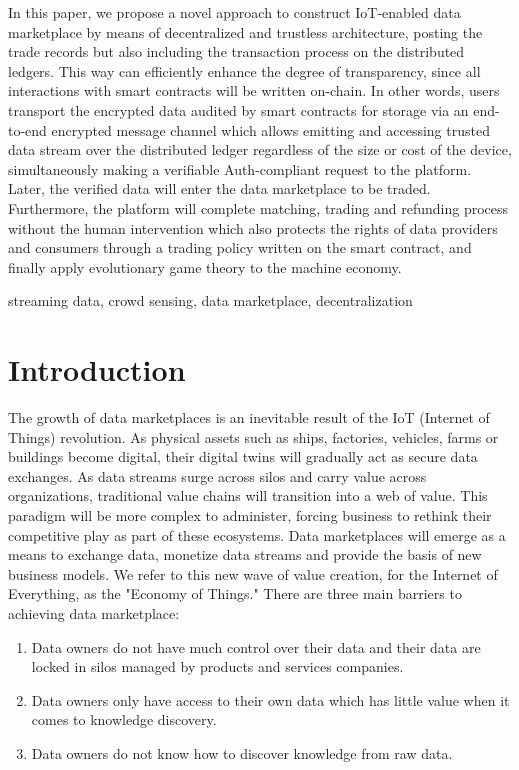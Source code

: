 \documentclass[journal,10pt,a4paper]{IEEEtran}
\begin{document}
In this paper, we propose a novel approach to construct IoT-enabled data marketplace by means of decentralized and trustless architecture, posting the trade records but also including the transaction process on the distributed ledgers. This way can efficiently enhance the degree of transparency, since all interactions with smart contracts will be written on-chain. In other words, users transport the encrypted data audited by smart contracts for storage via an end-to-end encrypted message channel which allows emitting and accessing trusted data stream over the distributed ledger regardless of the size or cost of the device, simultaneously making a verifiable Auth-compliant request to the platform. Later, the verified data will enter the data marketplace to be traded. Furthermore, the platform will complete matching, trading and refunding process without the human intervention which also protects the rights of data providers and consumers through a trading policy written on the smart contract, and finally apply evolutionary game theory to the machine economy.

\begin{IEEEkeywords}
    streaming data, crowd sensing, data marketplace, decentralization
\end{IEEEkeywords}

\section{\normalsize\textbf{Introduction}}
The growth of data marketplaces is an inevitable result of the IoT (Internet of Things) revolution. As physical assets such as ships, factories, vehicles, farms or buildings become digital, their digital twins will gradually act as secure data exchanges.\cite{digitaltwin}\cite{AutonomousDriving} As data streams surge across silos and carry value across organizations, traditional value chains will transition into a web of value. This paradigm will be more complex to administer, forcing business to rethink their competitive play as part of these ecosystems. Data marketplaces will emerge as a means to exchange data, monetize data streams and provide the basis of new business models. We refer to this new wave of value creation, for the Internet of Everything, as the "Economy of Things." There are three main barriers to achieving data marketplace:
\begin{enumerate}
    \item Data owners do not have much control over their data and their data are locked in silos managed by products and services companies.
    \item Data owners only have access to their own data which has little value when it comes to knowledge discovery.
    \item Data owners do not know how to discover knowledge from raw data.
\end{enumerate}
\end{document}
